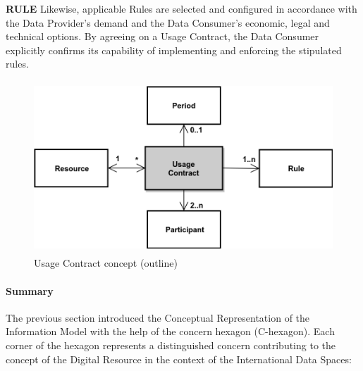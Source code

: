 \textbf{RULE} Likewise, applicable Rules are selected and configured in accordance with the Data Provider’s demand and the Data Consumer’s economic, legal and technical options. By agreeing on a Usage Contract, the Data Consumer explicitly confirms its capability of implementing and enforcing the stipulated rules.




\begin{figure}[H]
	\begin{Center}
		\includegraphics[width=4.67in,height=2.55in]{./media/image52.png}
		\caption{Usage Contract concept (outline)}
		\label{fig:Usage_Contract_concept_outline}
	\end{Center}
\end{figure}



\paragraph{Summary\\}
The previous section introduced the Conceptual Representation of the Information Model with the help of the concern hexagon (C-hexagon). Each corner of the hexagon represents a distinguished concern contributing to the concept of the Digital Resource in the context of the International Data Spaces: 

